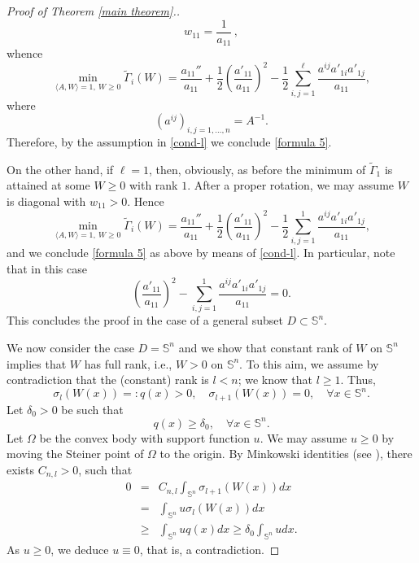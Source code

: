 \documentclass[12pt]{amsart}
\newcommand{\1}{\mathbf 1}
\newcommand{\sfe}{{{\mathbb S}^{n}}}
\begin{document}
\begin{proof}[Proof of Theorem \ref{main theorem}.]
\[
w_{11}=\frac{1}{a_{11}}\,,
\]
whence
\begin{equation}\label{cond-ll} 
\min_{\langle A,W\rangle=1, \ W\ge 0}\tilde \Gamma_i(W)=\frac{a_{11}''}{a_{11}}+\frac12\left(\frac{a'_{11}}{a_{11}}\right)^2-\frac12\sum_{i,j=1}^\ell \frac{a^{ij}a'_{1i}a'_{1j}}{a_{11}},
\end{equation}
where
$$
(a^{ij})_{i,j=1,\dots,n}=A^{-1}.
$$
Therefore, by the assumption in \eqref{cond-l} we conclude \eqref{formula 5}.

On the other hand, if $\ell=1$, then, obviously, as before the minimum of $\tilde \Gamma_1$ is attained at some $W\ge 0$ with rank $1$. After a proper rotation, we may assume $W$ is diagonal with $w_{11}>0$. Hence
\begin{equation}\label{cond-ll-bis} 
\min_{\langle A,W\rangle=1, \ W\ge 0}\tilde \Gamma_i(W)=\frac{a_{11}''}{a_{11}}+\frac12\left(\frac{a'_{11}}{a_{11}}\right)^2-\frac12\sum_{i,j=1}^1 \frac{a^{ij}a'_{1i}a'_{1j}}{a_{11}},
\end{equation}
and we conclude \eqref{formula 5} as above by means of \eqref{cond-l}. In particular, note that in this case
$$
\left(\frac{a'_{11}}{a_{11}}\right)^2-\sum_{i,j=1}^1 \frac{a^{ij}a'_{1i}a'_{1j}}{a_{11}}=0.
$$
This concludes the proof in the case of a general subset $D\subset\sfe$.

\medskip

We now consider the case $D=\sfe$ and we show that constant rank of $W$ on $\mathbb S^n$ implies that $W$ has full rank, i.e., $W>0$ on $\sfe$. To this aim, we assume by contradiction that the (constant) rank is $l<n$; we know that $l\ge 1$. Thus, 
\[
\sigma_{l}(W(x))=:q(x)>0, \quad \sigma_{l+1}(W(x))=0, \quad \forall x\in \mathbb S^n.
\] 
Let $\delta_0>0$ be such that
\[
q(x)\ge \delta_0, \quad \forall x\in \mathbb S^n.
\]
Let $\Omega$ be the convex body with support function $u$. We may assume $u\ge 0$ by moving the Steiner point of $\Omega$ to the origin. By Minkowski identities (see \cite[Section 5.3.1]{Schneider}), there exists $C_{n,l}>0$, such that
\begin{eqnarray*} 0&=&  C_{n,l} \int_{\mathbb S^n}\sigma_{l+1}(W(x))dx \\
&=& \int_{\mathbb S^n}u\sigma_{l}(W(x))dx\\
&\ge & \int_{\mathbb S^n}u q(x)dx\ge \delta_0 \int_{\mathbb S^n}udx. 
\end{eqnarray*}
As $u\ge 0$, we deduce $u\equiv 0$, that is, a contradiction.
\end{proof}
\end{document}
